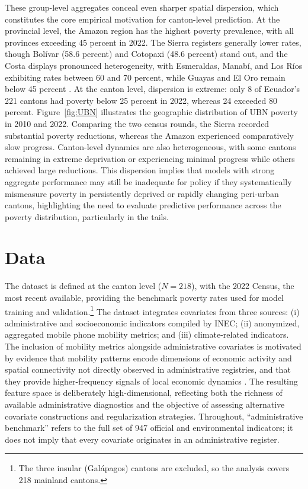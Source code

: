 \documentclass[pdflatex,sn-apa]{sn-jnl}
\begin{document}
These group-level aggregates conceal even sharper spatial dispersion, which constitutes the core empirical motivation for canton-level prediction. At the provincial level, the Amazon region has the highest poverty prevalence, with all provinces exceeding 45 percent in 2022. The Sierra registers generally lower rates, though Bol\'{i}var (58.6 percent) and Cotopaxi (48.6 percent) stand out, and the Costa displays pronounced heterogeneity, with Esmeraldas, Manab\'{i}, and Los R\'{i}os exhibiting rates between 60 and 70 percent, while Guayas and El Oro remain below 45 percent \citep{INEC2024NBI}. At the canton level, dispersion is extreme: only 8 of Ecuador's 221 cantons had poverty below 25 percent in 2022, whereas 24 exceeded 80 percent. Figure~\ref{fig:UBN} illustrates the geographic distribution of UBN poverty in 2010 and 2022. Comparing the two census rounds, the Sierra recorded substantial poverty reductions, whereas the Amazon experienced comparatively slow progress. Canton-level dynamics are also heterogeneous, with some cantons remaining in extreme deprivation or experiencing minimal progress while others achieved large reductions. This dispersion implies that models with strong aggregate performance may still be inadequate for policy if they systematically mismeasure poverty in persistently deprived or rapidly changing peri-urban cantons, highlighting the need to evaluate predictive performance across the poverty distribution, particularly in the tails.




\section{Data}
\label{sec:data}

The dataset is defined at the canton level ($N=218$), with the 2022 Census, the most recent available, providing the benchmark poverty rates used for model training and validation.\footnote{The three insular (Gal\'{a}pagos) cantons are excluded, so the analysis covers 218 mainland cantons.} The dataset integrates covariates from three sources: (i) administrative and socioeconomic indicators compiled by INEC; (ii) anonymized, aggregated mobile phone mobility metrics; and (iii) climate-related indicators. The inclusion of mobility metrics alongside administrative covariates is motivated by evidence that mobility patterns encode dimensions of economic activity and spatial connectivity not directly observed in administrative registries, and that they provide higher-frequency signals of local economic dynamics \citep{blumenstock2015predicting, hernandez2017estimating, scepanovic2015mobile}. The resulting feature space is deliberately high-dimensional, reflecting both the richness of available administrative diagnostics and the objective of assessing alternative covariate constructions and regularization strategies. Throughout, ``administrative benchmark'' refers to the full set of 947 official and environmental indicators; it does not imply that every covariate originates in an administrative register.
\end{document}
